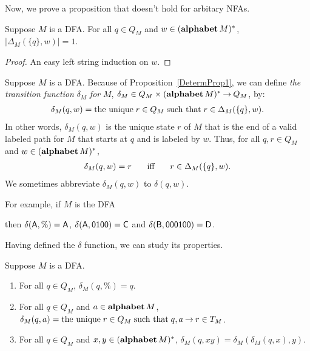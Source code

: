 Now, we prove a proposition that doesn't hold for arbitary NFAs.

\begin{proposition}
\label{DetermProp1}

Suppose $M$ is a DFA.  For all $q\in Q_M$ and $w\in(\mathbf{alphabet}\,M)^*$,
$|\Delta_M(\{q\},w)|=1${.}
\end{proposition}

\begin{proof}
An easy left string induction on $w$.
\end{proof}

Suppose $M$ is a DFA.  Because of Proposition~\ref{DetermProp1}, we
can define \emph{the transition function} $\delta_M$ \emph{for} $M$,
$\delta_M\in Q_M\times(\mathbf{alphabet}\,M)^*\mathbin{\to} Q_M$, by:
\begin{gather*}
\delta_M(q,w) = \allowbreak\mbox{the unique}\allowbreak\; r\in Q_M\;\allowbreak\mbox{such that}\allowbreak\;
r\in\Delta_M(\{q\},w) .
\end{gather*}
In other words, $\delta_M(q,w)$ is the unique state $r$ of $M$ that
is the end of a valid labeled path for $M$ that starts at $q$ and
is labeled by $w$.
Thus, for all $q,r\in Q_M$ and $w\in(\mathbf{alphabet}\,M)^*$,
\begin{gather*}
\delta_M(q,w)=r\quad\mathrel{\;\;\allowbreak\mbox{iff}\allowbreak\;\;}\quad r\in\Delta_M(\{q\},w) .
\end{gather*}
We sometimes abbreviate $\delta_M(q,w)$ to $\delta(q,w)$.

For example, if $M$ is the DFA
\begin{center}

\end{center}
then $\delta(\mathsf{A}, \%)={\mathsf{A}}$, $\delta(\mathsf{A}, \mathsf{0100})={\mathsf{C}}$
and $\delta(\mathsf{B}, \mathsf{000100})={\mathsf{D}}$.

Having defined the $\delta$ function, we can study its properties.

\begin{proposition}
\label{DetermProp2}
Suppose $M$ is a DFA.
\begin{enumerate}[\quad(1)]
\item For all $q\in Q_M$, $\delta_M(q,\%)={q}$.

\item For all $q\in Q_M$ and $a\in\mathbf{alphabet}\,M$,
$\delta_M(q,a)=\allowbreak\mbox{the unique}\allowbreak\;r\in Q_M\;\allowbreak\mbox{such that}\allowbreak\;
{q,a\mathbin{\to} r\in T_M}$.

\item For all $q\in Q_M$ and $x,y\in(\mathbf{alphabet}\,M)^*$,
$\delta_M(q,xy)={\delta_M(\delta_M(q,x),y)}$.
\end{enumerate}
\end{proposition}

